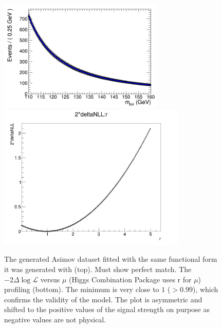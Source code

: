 \begin{figure}[htbp]
     \centering
     \includegraphics[width=0.7\textwidth]{figures/combine/asimovTests/cat6_x_fit_b.png}\\
     \includegraphics[width=0.8\textwidth]{figures/combine/asimovTests/NLL_asimovTest_p25GeV.png}
     \caption{The generated Asimov dataset fitted with the same functional form it was generated with (top). Must show perfect match. The $-2\Delta\log{\mathcal{L}}$ versus $\mu$ (Higgs Combination Package uses r for $\mu$) profiling (bottom). The minimum is very close to $1$ ($> 0.99$), which confirms the validity of the model. The plot is asymmetric and shifted to the positive values of the signal strength on purpose as negative values are not physical.}
     \label{fig:higgs_combination_asimovtests}
 \end{figure}


